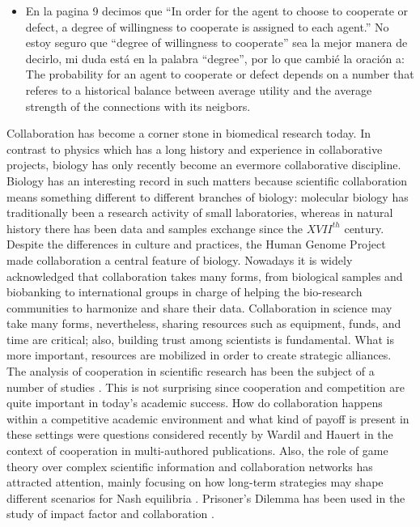 \documentclass[11pt]{article}
\begin{document}
\begin{itemize}
\item{En la pagina 9 decimos que ``In order for the agent to choose to cooperate
  or defect, a degree of willingness to cooperate is assigned to each agent.'' No estoy
  seguro que ``degree of willingness to cooperate'' sea la mejor manera de
  decirlo, mi duda está en la palabra ``degree'', por lo que cambi\'e la
  oraci\'on a: The probability for an agent to cooperate or defect depends on a
number that referes to a historical balance between average utility and the average strength of
the connections with its neigbors. }

  
\end{itemize}

Collaboration has become a corner stone in biomedical research today.
In contrast to physics which has a long history and experience in collaborative
projects, biology has only recently become an evermore collaborative
discipline\cite{Vermeulen2013}. Biology has an interesting record in such
matters because scientific collaboration means something different to
different branches of biology: molecular biology has traditionally been a
research activity of small laboratories\cite{KnorrCetina1999,Strasser2006},
whereas in natural history there has been data and samples exchange since the
$XVII^{th}$ century\cite{Muller2012,Strasser2012}.\\ 


Despite the differences in culture and practices, the Human Genome
Project made collaboration a central feature of biology. Nowadays it
is widely acknowledged that collaboration takes many forms, from
biological samples and biobanking to international groups in charge of
helping the bio-research communities to harmonize and share their
data. Collaboration in science may take many forms, nevertheless, sharing
resources such as equipment, funds, and time are critical; also, building
trust among scientists is fundamental. What is more important, resources are
mobilized in order to create strategic alliances.\\ 


The analysis of cooperation in scientific research has been the subject of a
number of studies
\cite{Vermeulen2013,Newman2001,Newman2004,Elango2012,HernandezLemus2013,Strasser2006,Strasser2012}. This
is not surprising since cooperation and competition are quite important in
today's academic success. How do collaboration happens within a competitive
academic environment and what kind of payoff is present in these settings were
questions considered recently by Wardil and Hauert \cite{Wardil2015} in the
context of cooperation in multi-authored publications. Also, the role of game
theory over complex scientific information and collaboration networks has
attracted attention, mainly focusing on how long-term strategies may shape
different scenarios for Nash equilibria \cite{hanauske2012}. Prisoner's Dilemma
has been used in the study of impact factor and collaboration
\cite{Hara_etal_2002,Lieberman_etal_2005}. \\  
\end{document}
